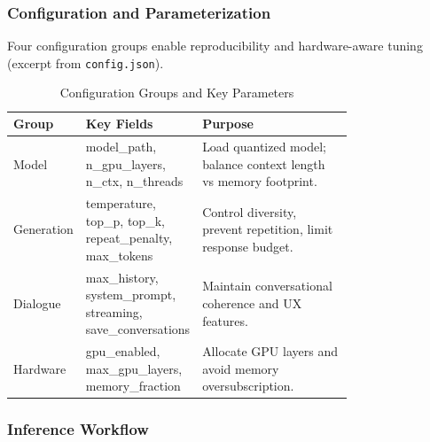 \documentclass[12pt,a4paper]{article}
\begin{document}
\subsubsection*{Configuration and Parameterization}

Four configuration groups enable reproducibility and hardware-aware tuning (excerpt from \texttt{config.json}).

\begin{table}[H]
\centering
\caption{Configuration Groups and Key Parameters}
\label{tab:config_params}
\begin{tabular}{|l|p{0.26\linewidth}|p{0.5\linewidth}|}
\hline
	\textbf{Group} & \textbf{Key Fields} & \textbf{Purpose} \\
\hline
Model & model\_path, n\_gpu\_layers, n\_ctx, n\_threads & Load quantized model; balance context length vs memory footprint. \\
Generation & temperature, top\_p, top\_k, repeat\_penalty, max\_tokens & Control diversity, prevent repetition, limit response budget. \\
Dialogue & max\_history, system\_prompt, streaming, save\_conversations & Maintain conversational coherence and UX features. \\
Hardware & gpu\_enabled, max\_gpu\_layers, memory\_fraction & Allocate GPU layers and avoid memory oversubscription. \\
\hline
\end{tabular}
\end{table}

\subsubsection*{Inference Workflow}
\end{document}
